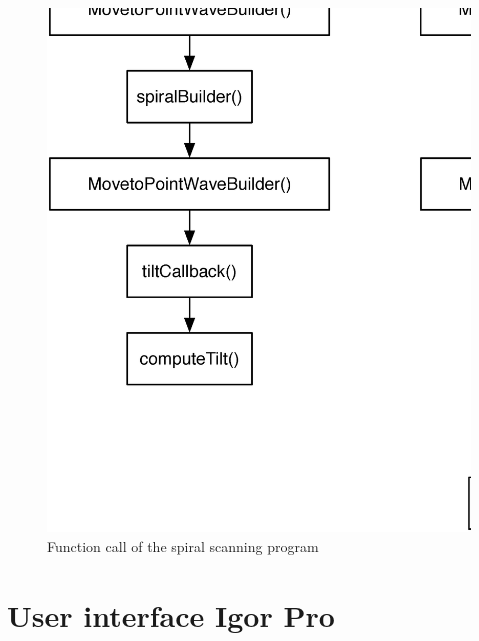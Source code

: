 \begin{figure}[H]
  \centering
  \includegraphics[scale=0.35]{images/functioncall.eps}
    \caption{Function call of the spiral scanning program}
  \label{functioncall}
\end{figure}

\section{User interface Igor Pro}

